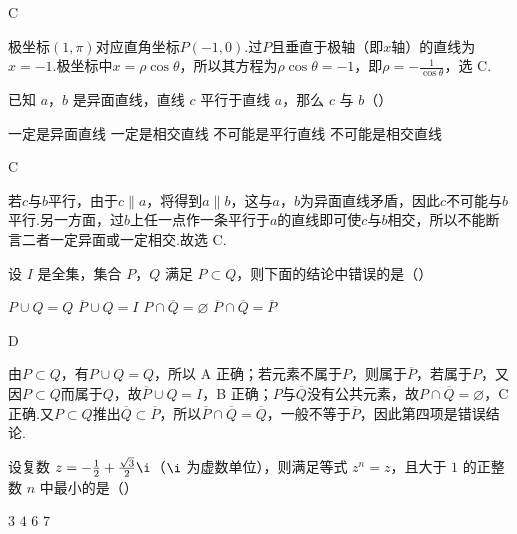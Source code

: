 \documentclass[UTF8,a4paper,oneside,11pt]{ctexbook}
\begin{document}
\begin{answer}
C
\end{answer}

\begin{solution}
极坐标\((1,\pi)\)对应直角坐标\(P(-1,0)\).过\(P\)且垂直于极轴（即\(x\)轴）的直线为\(x=-1\).极坐标中\(x=\rho\cos\theta\)，所以其方程为\(\rho\cos\theta=-1\)，即\(\rho=-\frac{1}{\cos\theta}\)，选 C.
\end{solution}

\begin{problem}
已知 \(a\)，\(b\) 是异面直线，直线 \(c\) 平行于直线 \(a\)，那么 \(c\) 与 \(b\)（\quad）

\choices
    {一定是异面直线}
    {一定是相交直线}
    {不可能是平行直线}
    {不可能是相交直线}
\end{problem}

\begin{answer}
C
\end{answer}

\begin{solution}
若\(c\)与\(b\)平行，由于\(c\parallel a\)，将得到\(a\parallel b\)，这与\(a\)，\(b\)为异面直线矛盾，因此\(c\)不可能与\(b\)平行.另一方面，过\(b\)上任一点作一条平行于\(a\)的直线即可使\(c\)与\(b\)相交，所以不能断言二者一定异面或一定相交.故选 C.
\end{solution}

\begin{problem}
设 \(I\) 是全集，集合 \(P\)，\(Q\) 满足 \(P \subset Q\)，则下面的结论中错误的是（\quad）

\choices
    {\(P \cup Q = Q\)}
    {\(\overline{P} \cup Q = I\)}
    {\(P \cap \overline{Q} = \varnothing\)}
    {\(\overline{P} \cap \overline{Q} = \overline{P}\)}
\end{problem}

\begin{answer}
D
\end{answer}

\begin{solution}
由\(P\subset Q\)，有\(P\cup Q=Q\)，所以 A 正确；若元素不属于\(P\)，则属于\(\overline P\)，若属于\(P\)，又因\(P\subset Q\)而属于\(Q\)，故\(\overline P\cup Q=I\)，B 正确；\(P\)与\(\overline Q\)没有公共元素，故\(P\cap\overline Q=\varnothing\)，C 正确.又\(P\subset Q\)推出\(\overline Q\subset\overline P\)，所以\(\overline P\cap\overline Q=\overline Q\)，一般不等于\(\overline P\)，因此第四项是错误结论.
\end{solution}

\begin{problem}
设复数 \(z = -\frac{1}{2} + \frac{\sqrt{3}}{2}\i\)（\(\i\) 为虚数单位），则满足等式 \(z^n = z\)，且大于 \(1\) 的正整数 \(n\) 中最小的是（\quad）

\choices
    {\(3\)}
    {\(4\)}
    {\(6\)}
    {\(7\)}
\end{problem}
\end{document}
